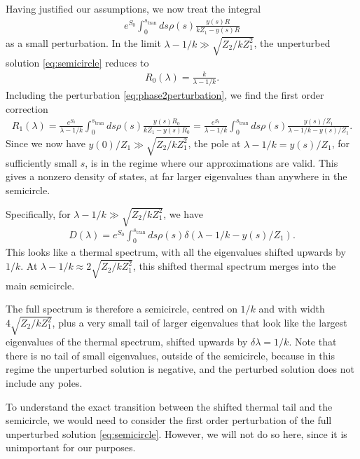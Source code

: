 \documentclass[11pt]{article}
\newcommand{\stran}{s_{\text{tran}}}
\numberwithin{equation}{section}
\begin{document}
Having justified our assumptions, we now treat the integral
\begin{align} \label{eq:phase2perturbation}
e^{S_0}\int_0^{\stran} ds \rho(s) \frac{y(s) R}{k Z_1 - y(s) R}
\end{align}
as a small perturbation. In the limit $\lambda - 1/k \gg \sqrt{Z_2 / k Z_1^2}$, the unperturbed solution \eqref{eq:semicircle} reduces to
\begin{align}
R_0 (\lambda) = \frac{k}{\lambda - 1/k}.
\end{align}
Including the perturbation \eqref{eq:phase2perturbation}, we find the first order correction
\begin{align} \label{eq:R1lambda}
R_1(\lambda) = \frac{ e^{S_0}}{\lambda - 1/k }\int_0^{\stran} ds \rho(s) \frac{y(s) R_0}{k Z_1 - y(s) R_0} = \frac{e^{S_0}}{\lambda - 1/k}\int_0^{\stran} ds \rho(s) \frac{y(s) /Z_1}{\lambda - 1/k - y(s)/ Z_1}.
\end{align}
Since we now have $y(0)/Z_1 \gg \sqrt{Z_2 / k Z_1^2}$, the pole at $\lambda - 1/k = y(s)/ Z_1$, for sufficiently small $s$, is in the regime where our approximations are valid. This gives a nonzero density of states, at far larger eigenvalues than anywhere in the semicircle. 

Specifically, for $\lambda - 1/k \gg \sqrt{Z_2 / k Z_1^2}$, we have
\begin{align} \label{eq:shiftedthermaltail}
D(\lambda) = e^{S_0} \int_0^{\stran} ds \rho(s) \delta( \lambda - 1/k - y(s)/ Z_1).
\end{align}
This looks like a thermal spectrum, with all the eigenvalues shifted upwards by $1/k$. At $\lambda - 1/k \approx 2 \sqrt{Z_2 / k Z_1^2}$, this shifted thermal spectrum merges into the main semicircle. 

The full spectrum is therefore a semicircle, centred on $1/k$ and with width $4 \sqrt{ Z_2 / k Z_1^2}$, plus a very small tail of larger eigenvalues that look like the largest eigenvalues of the thermal spectrum, shifted upwards by $\delta \lambda = 1/k$. Note that there is no tail of small eigenvalues, outside of the semicircle, because in this regime the unperturbed solution is negative, and the perturbed solution does not include any poles.

To understand the exact transition between the shifted thermal tail and the semicircle, we would need to consider the first order perturbation of the full unperturbed solution \eqref{eq:semicircle}. However, we will not do so here, since it is unimportant for our purposes. 
\end{document}
